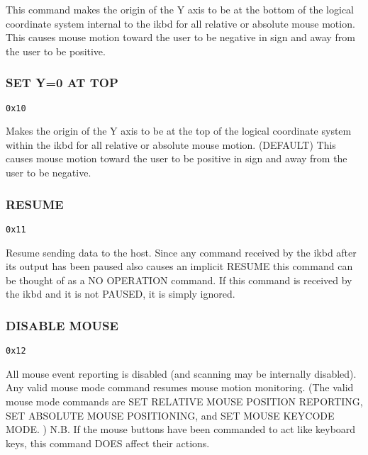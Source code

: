 \documentclass[a4paper,8pt,english]{sphinxmanual}
\begin{document}
This command makes the origin of the Y axis to be at the bottom of the
logical coordinate system internal to the ikbd for all relative or absolute
mouse motion. This causes mouse motion toward the user to be negative in sign
and away from the user to be positive.


\subsubsection{SET Y=0 AT TOP}
\label{input/devices/atarikbd:set-y-0-at-top}
\begin{Verbatim}[commandchars=\\\{\}]
0x10
\end{Verbatim}

Makes the origin of the Y axis to be at the top of the logical coordinate
system within the ikbd for all relative or absolute mouse motion. (DEFAULT)
This causes mouse motion toward the user to be positive in sign and away from
the user to be negative.


\subsubsection{RESUME}
\label{input/devices/atarikbd:resume}
\begin{Verbatim}[commandchars=\\\{\}]
0x11
\end{Verbatim}

Resume sending data to the host. Since any command received by the ikbd after
its output has been paused also causes an implicit RESUME this command can be
thought of as a NO OPERATION command. If this command is received by the ikbd
and it is not PAUSED, it is simply ignored.


\subsubsection{DISABLE MOUSE}
\label{input/devices/atarikbd:disable-mouse}
\begin{Verbatim}[commandchars=\\\{\}]
0x12
\end{Verbatim}

All mouse event reporting is disabled (and scanning may be internally
disabled). Any valid mouse mode command resumes mouse motion monitoring. (The
valid mouse mode commands are SET RELATIVE MOUSE POSITION REPORTING, SET
ABSOLUTE MOUSE POSITIONING, and SET MOUSE KEYCODE MODE. )
N.B. If the mouse buttons have been commanded to act like keyboard keys, this
command DOES affect their actions.
\end{document}
